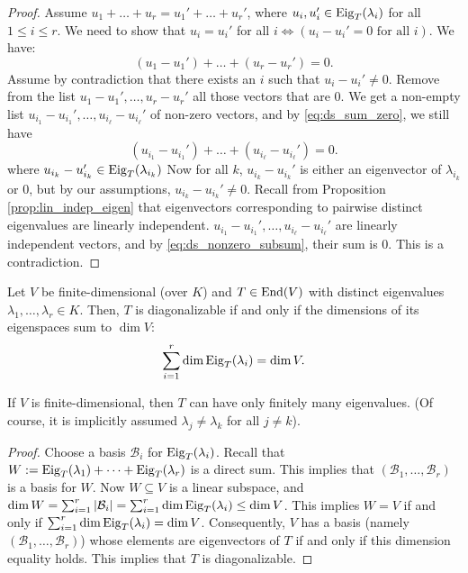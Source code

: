 \begin{proof}
  Assume $u_1 + \dots + u_r = u_1' + \dots + u_r'$, where $u_i, u_i' \in \operatorname{Eig}_T(\lambda_i)$ for all $1 \le i \le r$. We need to show that $u_i = u_i'$ for all $i \iff (u_i - u_i' = 0 \text{ for all } i)$.
  We have:
  \begin{equation} \label{eq:ds_sum_zero}
    (u_1 - u_1') + \dots + (u_r - u_r') = 0.
  \end{equation}
  Assume by contradiction that there exists an $i$ such that $u_i - u_i' \ne 0$.
  Remove from the list $u_1 - u_1', \dots, u_r - u_r'$ all those vectors that are 0. We get a non-empty list $u_{i_1} - u_{i_1}', \dots, u_{i_\ell} - u_{i_\ell}'$ of non-zero vectors, and by \eqref{eq:ds_sum_zero}, we still have
  \begin{equation} \label{eq:ds_nonzero_subsum}
    (u_{i_1} - u_{i_1}') + \dots + (u_{i_\ell} - u_{i_\ell}') = 0.
  \end{equation}
  where $u_{i_k} - u_{i_k}' \in \operatorname{Eig}_T(\lambda_{i_k})$
  Now for all $k$, $u_{i_k} - u_{i_k}'$ is either an eigenvector of $\lambda_{i_k}$ or 0, but by our assumptions, $u_{i_k} - u_{i_k}' \ne 0$.
  Recall from Proposition \ref{prop:lin_indep_eigen} that eigenvectors corresponding to pairwise distinct eigenvalues are linearly independent. $u_{i_1} - u_{i_1}', \dots, u_{i_\ell} - u_{i_\ell}'$ are linearly independent vectors, and by \eqref{eq:ds_nonzero_subsum}, their sum is 0. This is a contradiction.
\end{proof}

\begin{corollary}\label{cor:diagonalizability_eigenspaces}
  Let $V$ be finite-di\-men\-sional (over $K$) and $T \in \operatorname{End}(V)$ with distinct eigenvalues $\lambda_1, \dots, \lambda_r \in K$. Then, $T$ is diagonalizable if and only if the dimensions of its eigenspaces sum to $\dim V$:
  \[ \sum_{i=1}^r \dim \operatorname{Eig}_T(\lambda_i) = \dim V. \]
\end{corollary}

\begin{exercise}\label{ex:finite_eigenvalues}
  If $V$ is finite-dimensional, then $T$ can have only finitely many eigenvalues. (Of course, it is implicitly assumed $\lambda_j \ne \lambda_k$ for all $j \ne k$).
\end{exercise}

\begin{proof}
  Choose a basis $\mathcal{B}_i$ for $\operatorname{Eig}_T(\lambda_i)$. Recall that $W := \operatorname{Eig}_T(\lambda_1) + \dots + \operatorname{Eig}_T(\lambda_r)$ is a direct sum.
  This implies that $(\mathcal{B}_1, \dots, \mathcal{B}_r)$ is a basis for $W$.
  Now $W \subseteq V$ is a linear subspace, and $\dim W = \sum_{i=1}^r |\mathcal{B}_i| = \sum_{i=1}^r \dim \operatorname{Eig}_T(\lambda_i) \le \dim V$.
  This implies $W = V$ if and only if $\sum_{i=1}^r \dim \operatorname{Eig}_T(\lambda_i) = \dim V$. Consequently, $V$ has a basis (namely $(\mathcal{B}_1, \dots, \mathcal{B}_r)$) whose elements are eigenvectors of $T$ if and only if this dimension equality holds. This implies that $T$ is diagonalizable.
\end{proof}

